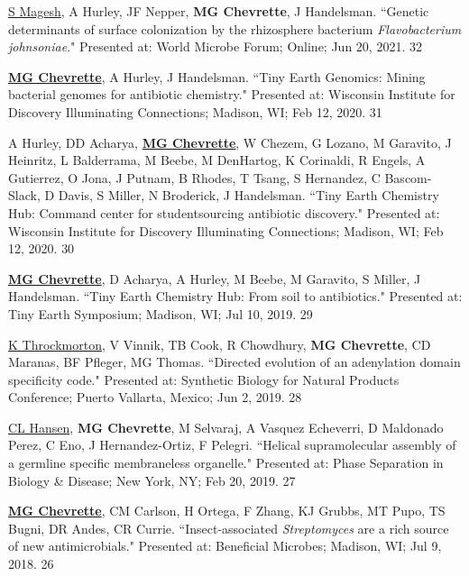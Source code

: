 \begin{cvpubs}

\cvpub
{\underline{S Magesh}, A Hurley, JF Nepper, \textbf{MG Chevrette}, J Handelsman. ``Genetic determinants of surface colonization by the rhizosphere bacterium \textit{Flavobacterium johnsoniae}." Presented at: World Microbe Forum; Online; Jun 20, 2021.}
{32}

\cvpub
{\underline{\textbf{MG Chevrette}}, A Hurley, J Handelsman. ``Tiny Earth Genomics: Mining bacterial genomes for antibiotic chemistry." Presented at: Wisconsin Institute for Discovery Illuminating Connections; Madison, WI; Feb 12, 2020.}
{31}

\cvpub
{A Hurley, DD Acharya, \underline{\textbf{MG Chevrette}}, W Chezem, G Lozano, M Garavito, J Heinritz, L Balderrama, M Beebe, M DenHartog, K Corinaldi, R Engels, A Gutierrez, O Jona, J Putnam, B Rhodes, T Tsang, S Hernandez, C Bascom-Slack, D Davis, S Miller, N Broderick, J Handelsman. ``Tiny Earth Chemistry Hub: Command center for studentsourcing antibiotic discovery." Presented at: Wisconsin Institute for Discovery Illuminating Connections; Madison, WI; Feb 12, 2020.}
{30}

\cvpub
{\underline{\textbf{MG Chevrette}}, D Acharya, A Hurley, M Beebe, M Garavito, S Miller, J Handelsman. ``Tiny Earth Chemistry Hub: From soil to antibiotics." Presented at: Tiny Earth Symposium; Madison, WI; Jul 10, 2019.}
{29}

\cvpub
{\underline{K Throckmorton}, V Vinnik, TB Cook, R Chowdhury, \textbf{MG Chevrette}, CD Maranas, BF Pfleger, MG Thomas. ``Directed evolution of an adenylation domain specificity code." Presented at: Synthetic Biology for Natural Products Conference; Puerto Vallarta, Mexico; Jun 2, 2019.}
{28}

\end{cvpubs} \begin{cvpubs}

\cvpub
{\underline{CL Hansen}, \textbf{MG Chevrette}, M Selvaraj, A Vasquez Echeverri, D Maldonado Perez, C Eno, J Hernandez-Ortiz, F Pelegri. ``Helical supramolecular assembly of a germline specific membraneless organelle." Presented at: Phase Separation in Biology \& Disease; New York, NY; Feb 20, 2019.}
{27}

\cvpub
{\underline{\textbf{MG Chevrette}}, CM Carlson, H Ortega, F Zhang, KJ Grubbs, MT Pupo, TS Bugni, DR Andes, CR Currie. ``Insect-associated \textit{Streptomyces} are a rich source of new antimicrobials." Presented at: Beneficial Microbes; Madison, WI; Jul 9, 2018.}
{26}


\end{cvpubs}
